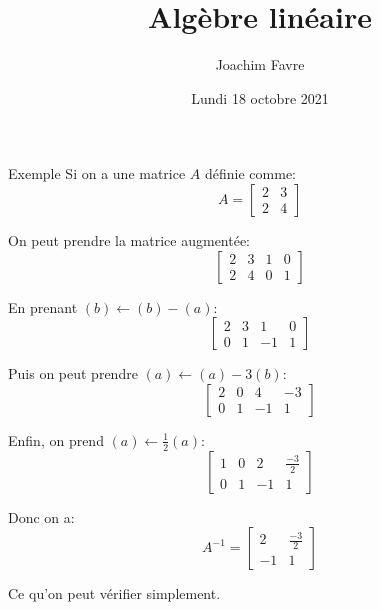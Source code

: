 \documentclass[a4paper]{article}
\title{Algèbre linéaire}
\author{Joachim Favre}
\date{Lundi 18 octobre 2021}
\begin{document}
\maketitle



\begin{parag}{Exemple}
    Si on a une matrice $A$ définie comme:
    \[A = \begin{bmatrix} 2 & 3 \\ 2 & 4 \end{bmatrix} \]

    On peut prendre la matrice augmentée:
    \[\begin{bmatrix} 2 & 3 & 1 & 0 \\ 2 & 4 & 0 & 1 \end{bmatrix} \]

    En prenant $\left(b\right) \leftarrow \left(b\right) - \left(a\right)$:
    \[\begin{bmatrix} 2 & 3 & 1 & 0 \\ 0 & 1 & -1 & 1 \end{bmatrix} \]

    Puis on peut prendre $\left(a\right) \leftarrow \left(a\right) - 3\left(b\right)$:
    \[\begin{bmatrix} 2 & 0 & 4 & -3 \\ 0 & 1 & -1 & 1 \end{bmatrix} \]

    Enfin, on prend $\left(a\right) \leftarrow \frac{1}{2} \left(a\right)$:
    \[\begin{bmatrix} 1 & 0 & 2 & \frac{-3}{2} \\ 0 & 1 & -1 & 1 \end{bmatrix} \]

    Donc on a:
    \[A^{-1} = \begin{bmatrix} 2 & \frac{-3}{2} \\ -1 & 1 \end{bmatrix} \]

    Ce qu'on peut vérifier simplement.
\end{parag}
\end{document}
